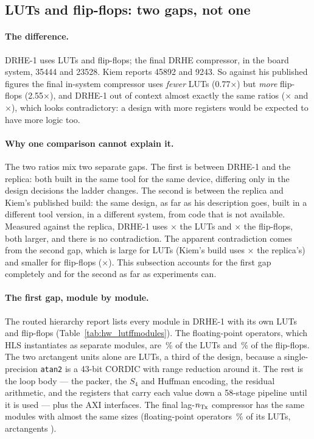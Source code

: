 \subsection{LUTs and flip-flops: two gaps, not one}
\label{sec:hw_lutff}

\paragraph{The difference.} DRHE-1 uses  LUTs and
 flip-flops; the final DRHE compressor, in the board system,
\num{35444} and \num{23528}. Kiem reports \num{45892} and \num{9243}. So
against his published figures the final in-system compressor uses
\emph{fewer} LUTs (0.77$\times$) but \emph{more} flip-flops (2.55$\times$),
and DRHE-1 out of context almost exactly the same ratios
($\times$ and $\times$), which looks
contradictory: a design with more
registers would be expected to have more logic too.

\paragraph{Why one comparison cannot explain it.} The two ratios mix two
separate gaps. The first is between DRHE-1 and the replica: both built in the
same tool for the same device, differing only in the design decisions the
ladder changes. The second is between the replica and Kiem's published build:
the same design, as far as his description goes, built in a different tool
version, in a different system, from code that is not available. Measured
against the replica, DRHE-1 uses $\times$ the LUTs and
$\times$ the flip-flops, both larger, and there is no
contradiction. The apparent contradiction comes from the second gap, which is
large for LUTs (Kiem's build uses $\times$ the replica's)
and smaller for flip-flops ($\times$). This subsection
accounts for the first gap completely and for the second as far as experiments
can.

\paragraph{The first gap, module by module.} The routed hierarchy report lists
every module in DRHE-1 with its own LUTs and flip-flops
(Table~\ref{tab:hw_lutffmodules}). The floating-point operators, which HLS
instantiates as separate modules, are \,\% of the LUTs
and \,\% of the flip-flops. The two arctangent units
alone are  LUTs, a third of the design, because a
single-precision \texttt{atan2} is a 43-bit CORDIC with range reduction around
it. The rest is the loop body --- the packer, the $S_4$ and Huffman encoding,
the residual arithmetic, and the registers that carry each value down a
58-stage pipeline until it is used --- plus the AXI interfaces. The final
lag-$n_{\mathrm{Tx}}$ compressor has the same modules with almost the same sizes
(floating-point operators \,\% of its LUTs, arctangents
).

